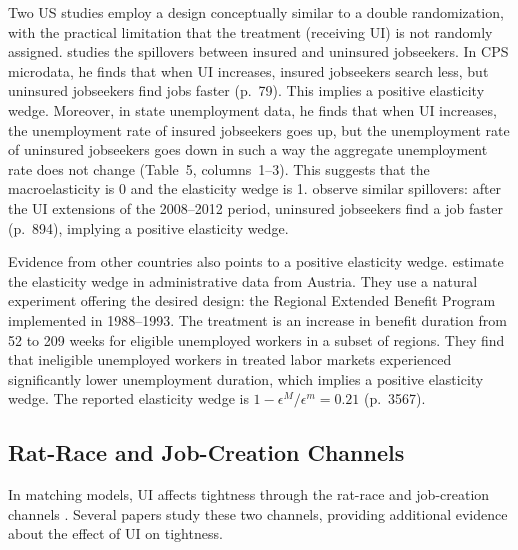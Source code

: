 \documentclass[letterpaper,12pt,leqno]{article}
\def \e{{\epsilon}}
\begin{document}
Two US studies employ a design conceptually similar to a double randomization, with the practical limitation that the treatment (receiving UI) is not randomly assigned. \citet{L93} studies the spillovers between insured and uninsured jobseekers. In CPS microdata, he finds that when UI increases, insured jobseekers search less, but uninsured jobseekers find jobs faster (p.~79). This implies a positive elasticity wedge. Moreover, in state unemployment data, he finds that when UI increases, the unemployment rate of insured jobseekers goes up, but the unemployment rate of uninsured jobseekers goes down in such a way the aggregate unemployment rate does not change (Table~5, columns~1--3). This suggests that the macroelasticity is 0 and the elasticity wedge is 1. \citet{FV13} observe similar spillovers: after the UI extensions of the 2008--2012 period, uninsured jobseekers find a job faster (p.~894), implying a positive elasticity wedge.

Evidence from other countries also points to a positive elasticity wedge. \citet{LLZ12} estimate the elasticity wedge in administrative data from Austria. They use a natural experiment offering the desired design: the Regional Extended Benefit Program implemented in 1988--1993. The treatment is an increase in benefit duration from 52 to 209 weeks for eligible unemployed workers in a subset of regions. They find that ineligible unemployed workers in treated labor markets experienced significantly lower unemployment duration, which implies a positive elasticity wedge. The reported elasticity wedge is $1-\e^{M}/\e^{m} = 0.21$ (p.~3567).

\subsection{Rat-Race and Job-Creation Channels}

In matching models, UI affects tightness through the rat-race and job-creation channels \citep[Figure~4]{LMS10}. Several papers study these two channels, providing additional evidence about the effect of UI on tightness.
\end{document}
